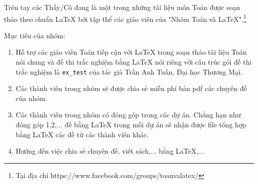 \documentclass[12pt,a4paper,oneside]{book}
\begin{document}
\vspace{0.6cm}

\noindent Trên tay các Thầy/Cô đang là một trong những tài liệu môn Toán được soạn thảo theo chuẩn \LaTeX{} bởi tập thể các giáo viên của "Nhóm Toán và LaTeX".\footnote{Tại địa chỉ https://www.facebook.com/groups/toanvalatex/}

\vspace{0.6cm}

\noindent Mục tiêu của nhóm: 
\begin{enumerate}
\item Hỗ trợ các giáo viên Toán tiếp cận với \LaTeX{} trong soạn thảo tài liệu Toán nói chung và đề thi trắc nghiệm bằng \LaTeX{} nói riêng với cấu trúc gói đề thi trắc nghiệm là \texttt{ex\_test} của tác giả Trần Anh Tuấn, Đại học Thương Mại.
\item Các thành viên trong nhóm sẽ được chia sẻ miễn phí bản pdf  các chuyên đề của nhóm.
\item Các thành viên trong nhóm có đóng góp trong các dự án. Chẳng hạn như đóng góp 1,2,... đề bằng \LaTeX{} trong mỗi dự án sẽ nhận được file tổng hợp bằng \LaTeX{} các đề từ các thành viên khác.
\item Hướng đến việc chia sẻ chuyên đề, viết sách,... bằng \LaTeX,...
\end{enumerate}
\newpage 
\newpage 
\newpage 
\newpage 
\newpage 
\newpage 
\newpage 
\newpage 
\newpage 
\newpage 
\newpage 
\newpage 
\newpage 
\newpage 
\end{document}
